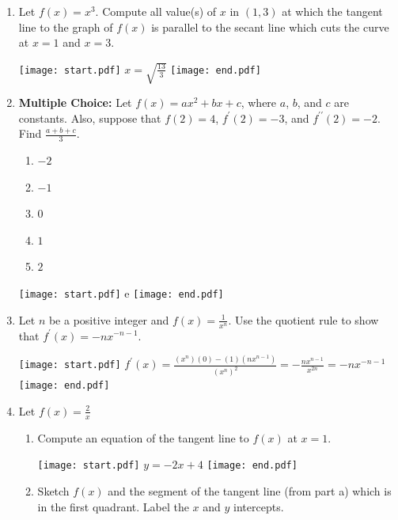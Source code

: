 \documentclass[12pt]{article}
\begin{document}
\begin{enumerate}
\item Let $f(x)=x^3$.  Compute all value(s) of $x$ in $(1,3)$ at which the tangent line to the graph of $f(x)$ is parallel to the secant line which cuts the curve at $x=1$ and $x=3$.

\texttt{[image: start.pdf]}
{{$\displaystyle x=\sqrt{\frac{13}{3}}$}}
\texttt{[image: end.pdf]}


\item {\bf Multiple Choice:} Let $f(x)=ax^2+bx+c$, where $a$, $b$, and $c$ are constants.  Also, suppose that $f(2)=4$, $f^{\prime}(2)=-3$, and $f^{\prime \prime}(2)=-2$.  Find $\frac{a+b+c}{3}$.

\begin{enumerate}

\item $-2$

\item $-1$

\item $0$

\item $1$

\item $2$

\end{enumerate}

\texttt{[image: start.pdf]}
{{e}}
\texttt{[image: end.pdf]}


\item Let $n$ be a positive integer and $\displaystyle f(x)=\frac{1}{x^n}$.  Use the quotient rule to show that $f^{\prime}(x)=-nx^{-n-1}$.

\texttt{[image: start.pdf]}
{{$\displaystyle f^{\prime}(x)=\frac{(x^n)(0)-(1)(nx^{n-1})}{(x^n)^2}=-\frac{nx^{n-1}}{x^{2n}}=-nx^{-n-1}$}}
\texttt{[image: end.pdf]}


\item Let $\displaystyle f(x)=\frac{2}{x}$

\begin{enumerate}

\item Compute an equation of the tangent line to $f(x)$ at $x=1$.

\texttt{[image: start.pdf]}
{{$y=-2x+4$}}
\texttt{[image: end.pdf]}


\item Sketch $f(x)$ and the segment of the tangent line (from part a) which is in the first quadrant.  Label the $x$ and $y$ intercepts.


\end{enumerate}
\end{enumerate}
\end{document}
